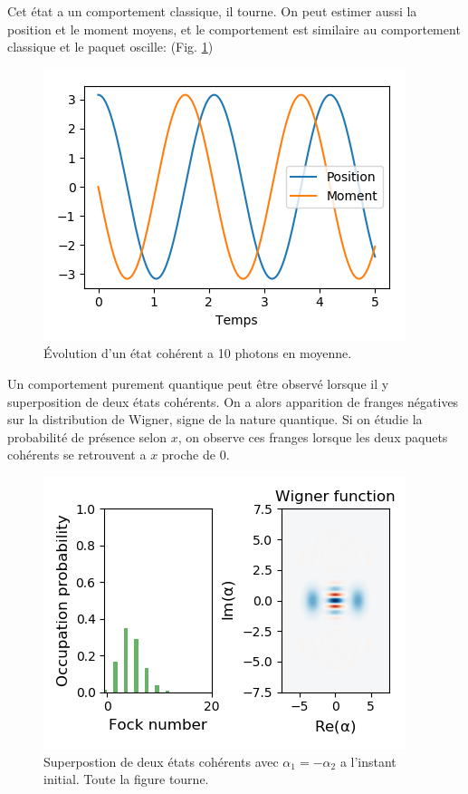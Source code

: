 \documentclass[11pt,a4paper]{article}
\begin{document}
	Cet état a un comportement classique, il tourne. On peut estimer aussi la position et le moment moyens, et le comportement est similaire au comportement classique et le paquet oscille: (Fig. \ref{fig:coherent_evol})
	\begin{figure}
		\centering
		\includegraphics[width=0.7\linewidth]{Coherent_evol_val}
		\caption{Évolution d'un état cohérent a 10 photons en moyenne.}
		\label{fig:coherent_evol}
	\end{figure}
	
	Un comportement purement quantique peut être observé lorsque il y superposition de deux états cohérents. On a alors apparition de franges négatives sur la distribution de Wigner, signe de la nature quantique.
	Si on étudie la probabilité de présence selon $x$, on observe ces franges lorsque les deux paquets cohérents se retrouvent a $x$ proche de 0.
	
	\begin{figure}
		\centering
		\includegraphics[width=0.7\linewidth]{Sum_coherent}
		\caption{Superpostion de deux états cohérents avec $\alpha_1=-\alpha_2$ a l'instant initial. Toute la figure tourne.}
		\label{fig:sum_coherent}
	\end{figure}
	
\end{document}
